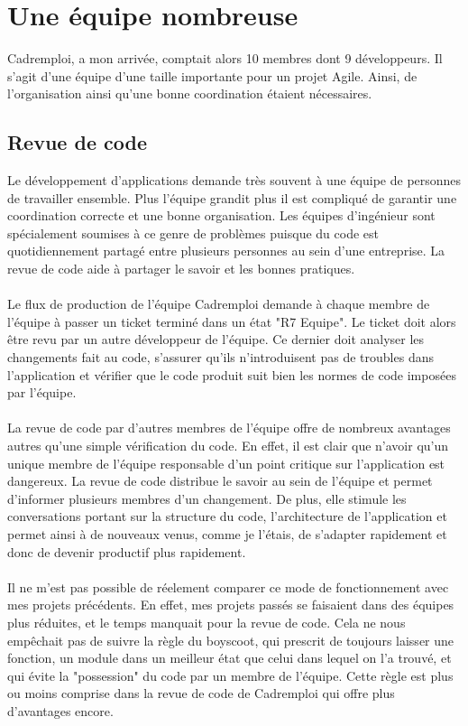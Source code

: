 \section{Une équipe nombreuse}
\label{sec:Une équipe nombreuse}
Cadremploi, a mon arrivée, comptait alors 10 membres dont 9 développeurs.
Il s'agit d'une équipe d'une taille importante pour un projet Agile.
Ainsi, de l'organisation ainsi qu'une bonne coordination étaient nécessaires.

\subsection{Revue de code}
\label{sub:Revue de code}
Le développement d'applications demande très souvent à une équipe de personnes de travailler ensemble.
Plus l'équipe grandit plus il est compliqué de garantir une coordination correcte et une bonne organisation.
Les équipes d'ingénieur sont spécialement soumises à ce genre de problèmes puisque du code est quotidiennement partagé entre plusieurs personnes au sein d'une entreprise.
La revue de code aide à partager le savoir et les bonnes pratiques.
\paragraph{}
Le flux de production de l'équipe Cadremploi demande à chaque membre de l'équipe à passer un ticket terminé dans un état "R7 Equipe".
Le ticket doit alors être revu par un autre développeur de l'équipe.
Ce dernier doit analyser les changements fait au code, s'assurer qu'ils n'introduisent pas de troubles dans l'application et vérifier que le code produit suit bien les normes de code imposées par l'équipe.
\paragraph{}
La revue de code par d'autres membres de l'équipe offre de nombreux avantages autres qu'une simple vérification du code.
En effet, il est clair que n'avoir qu'un unique membre de l'équipe responsable d'un point critique sur l'application est dangereux.
La revue de code distribue le savoir au sein de l'équipe et permet d'informer plusieurs membres d'un changement.
De plus, elle stimule les conversations portant sur la structure du code, l'architecture de l'application et permet ainsi à de nouveaux venus, comme je l'étais, de s'adapter rapidement et donc de devenir productif plus rapidement.
\paragraph{}
Il ne m'est pas possible de réelement comparer ce mode de fonctionnement avec mes projets précédents.
En effet, mes projets passés se faisaient dans des équipes plus réduites, et le temps manquait pour la revue de code.
Cela ne nous empêchait pas de suivre la règle du boyscoot, qui prescrit de toujours laisser une fonction, un module dans un meilleur état que celui dans lequel on l'a trouvé, et qui évite la "possession" du code par un membre de l'équipe.
Cette règle est plus ou moins comprise dans la revue de code de Cadremploi qui offre plus d'avantages encore.

